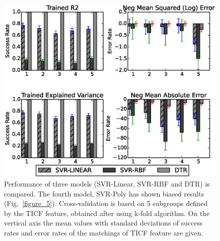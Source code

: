 \documentclass{bmcart}
\begin{document}
\begin{backmatter}
\begin{figure}[h!]
  \centering
  \includegraphics{Fig7.eps}
  \caption{
     Performance of three models (SVR-Linear,
SVR-RBF and DTR) is compared. The fourth model, SVR-Poly has shown
biased results (Fig.~\ref{figure_5}). Cross-validation is based on 5 subgroups
defined by the TICF feature, obtained after using k-fold algorithm. On
the vertical axis the mean values with standard deviations of success
rates and error rates of the matchings of TICF feature are given.
  }
  \label{figure_7}
\end{figure}




\end{backmatter}
\end{document}
